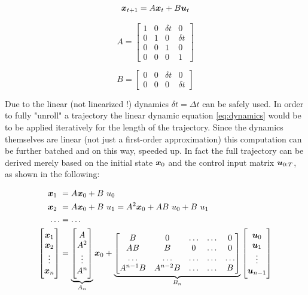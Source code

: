 \begin{equation}
\boldsymbol{x}_{t+1} = A \boldsymbol{x}_t + B \boldsymbol{u}_t
\label{eq:dynamics}
\end{equation}

\begin{minipage}{0.5\textwidth}
$$A = \begin{bmatrix} 1 & 0 & \delta t & 0 \\ 0 & 1 & 0 & \delta t \\ 0 & 0 & 1 & 0 \\ 0 & 0 & 0 & 1\end{bmatrix}$$
\end{minipage}
\begin{minipage}{0.5\textwidth}
$$B = \begin{bmatrix} 0 & 0 & \delta t & 0 \\ 0 & 0 & 0 & \delta t \end{bmatrix}$$
\end{minipage}

Due to the linear (not linearized !) dynamics $\delta t = \Delta t$ can be safely used. In order to fully "unroll" a trajectory the linear dynamic equation \ref{eq:dynamics} would be to be applied iteratively for the length of the trajectory. Since the dynamics themselves are linear (not just a first-order approximation) this computation can be further batched and on this way, speeded up. In fact the full trajectory can be derived merely based on the initial state $\boldsymbol{x}_0$ and the control input matrix $\boldsymbol{u}_{0:T}$, as shown in the following:

\begin{align}
\x_1 &= A \x_0 + B \ u_0 \\
\x_2 &= A \x_0 + B \ u_1 = A^2 \x_0 + A B \ u_0 + B \ u_1\\ 
\hdots &= \hdots \\
\begin{bmatrix} \x_1 \\ \x_2 \\ \vdots \\ \x_n \end{bmatrix} &= \underbrace{\begin{bmatrix} A \\ A^2 \\ \vdots \\ A^n \end{bmatrix}}_{\substack{A_n}} \x_0 + \underbrace{\begin{bmatrix} B & 0 & \hdots & \hdots & 0 \\ AB & B & 0 & \hdots & 0 \\ \hdots & \hdots & \hdots & \hdots & \hdots \\ A^{n-1} B & A^{n-2} B & \hdots & \hdots & B \end{bmatrix}}_{\substack{B_n}} \begin{bmatrix} \u_0 \\ \u_1 \\ \vdots \\ \u_{n-1} \end{bmatrix}
\end{align}

